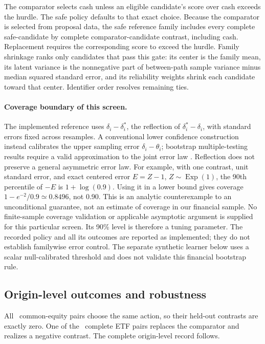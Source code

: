 The comparator selects cash unless an eligible candidate's score over cash
exceeds the hurdle. The safe policy defaults to that exact
choice. Because the comparator is selected from proposal data, the safe
reference family includes every complete safe-candidate by complete
comparator-candidate contrast, including cash. Replacement requires the
corresponding score to exceed the hurdle. Family shrinkage
ranks only candidates that pass this gate: its center is the family mean,
its latent variance is the nonnegative part of between-path sample variance
minus median squared standard error, and its reliability weights shrink each
candidate toward that center. Identifier order resolves remaining ties.

\paragraph{Coverage boundary of this screen.}
The implemented reference uses \(\delta_i-\delta_i^*\), the reflection of
\(\delta_i^*-\delta_i\), with standard errors fixed across resamples.
A conventional lower confidence construction instead calibrates the upper
sampling error \(\delta_i-\theta_i\); bootstrap multiple-testing results
require a valid approximation to the joint error law
\citep{RomanoWolf2005}. Reflection does not preserve a general asymmetric
error law. For example, with one contrast, unit standard error, and exact
centered error \(E=Z-1\), \(Z\sim\operatorname{Exp}(1)\), the 90th
percentile of \(-E\) is \(1+\log(0.9)\). Using it in a lower bound gives
coverage \(1-e^{-2}/0.9\simeq0.8496\), not 0.90. This is an analytic
counterexample to an unconditional guarantee, not an estimate of coverage in
our financial sample. No finite-sample coverage validation or applicable
asymptotic argument is supplied for this particular screen. Its 90\% level
is therefore a tuning parameter. The recorded policy and all its outcomes
are reported as implemented; they do not establish familywise error control.
The separate synthetic learner below uses a scalar null-calibrated threshold
and does not validate this financial bootstrap rule.

\subsection{Origin-level outcomes and robustness}

All \AORPointInTimeEquityOrigins\ common-equity pairs choose the same action,
so their held-out contrasts are exactly zero. One of the
\AORPointInTimeETFOrigins\ complete ETF pairs replaces the comparator and
realizes a negative contrast. The complete origin-level record follows.


